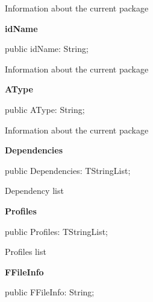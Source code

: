 \documentclass{report}
\newif\ifpdf
\begin{document}
\begin{list}{}
\begin{flushleft}
\ifpdf
\end{flushleft}
\fi


\par Information about the current package\label{mainunit.TIWizFrm-idName}
\item[\textbf{idName}\hfill]
\ifpdf
\begin{flushleft}
\fi
\begin{ttfamily}
public idName: String;\end{ttfamily}

\ifpdf
\end{flushleft}
\fi


\par Information about the current package\label{mainunit.TIWizFrm-AType}
\item[\textbf{AType}\hfill]
\ifpdf
\begin{flushleft}
\fi
\begin{ttfamily}
public AType: String;\end{ttfamily}

\ifpdf
\end{flushleft}
\fi


\par Information about the current package\label{mainunit.TIWizFrm-Dependencies}
\item[\textbf{Dependencies}\hfill]
\ifpdf
\begin{flushleft}
\fi
\begin{ttfamily}
public Dependencies: TStringList;\end{ttfamily}

\ifpdf
\end{flushleft}
\fi


\par Dependency list\label{mainunit.TIWizFrm-Profiles}
\item[\textbf{Profiles}\hfill]
\ifpdf
\begin{flushleft}
\fi
\begin{ttfamily}
public Profiles: TStringList;\end{ttfamily}

\ifpdf
\end{flushleft}
\fi


\par Profiles list\label{mainunit.TIWizFrm-FFileInfo}
\item[\textbf{FFileInfo}\hfill]
\ifpdf
\begin{flushleft}
\fi
\begin{ttfamily}
public FFileInfo: String;\end{ttfamily}


\end{flushleft}
\end{list}
\end{document}
